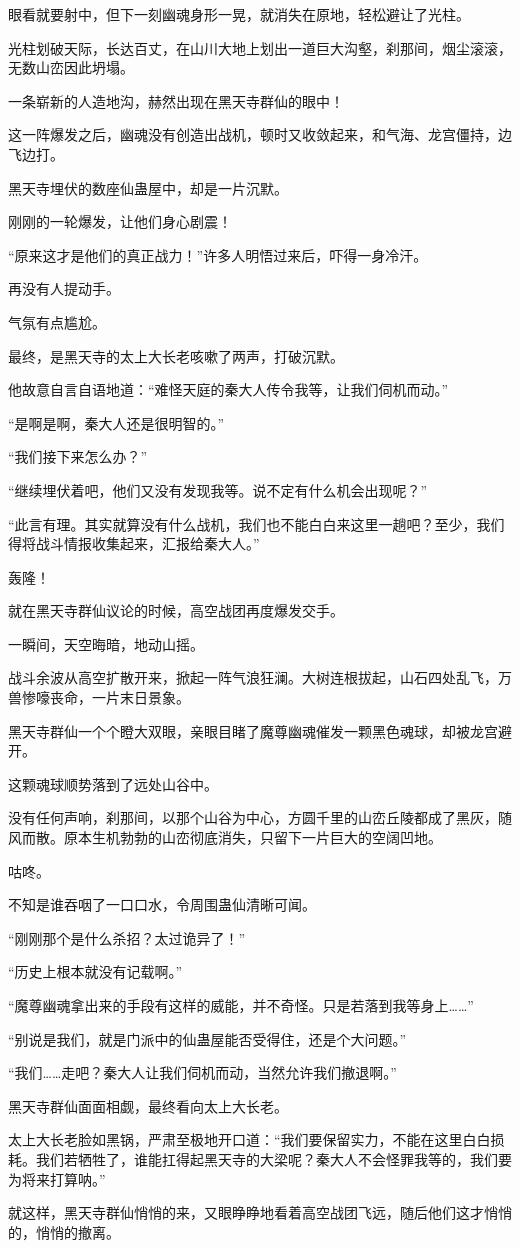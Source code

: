 \begin{this_body}
眼看就要射中，但下一刻幽魂身形一晃，就消失在原地，轻松避让了光柱。

光柱划破天际，长达百丈，在山川大地上划出一道巨大沟壑，刹那间，烟尘滚滚，无数山峦因此坍塌。

一条崭新的人造地沟，赫然出现在黑天寺群仙的眼中！

这一阵爆发之后，幽魂没有创造出战机，顿时又收敛起来，和气海、龙宫僵持，边飞边打。

黑天寺埋伏的数座仙蛊屋中，却是一片沉默。

刚刚的一轮爆发，让他们身心剧震！

“原来这才是他们的真正战力！”许多人明悟过来后，吓得一身冷汗。

再没有人提动手。

气氛有点尴尬。

最终，是黑天寺的太上大长老咳嗽了两声，打破沉默。

他故意自言自语地道：“难怪天庭的秦大人传令我等，让我们伺机而动。”

“是啊是啊，秦大人还是很明智的。”

“我们接下来怎么办？”

“继续埋伏着吧，他们又没有发现我等。说不定有什么机会出现呢？”

“此言有理。其实就算没有什么战机，我们也不能白白来这里一趟吧？至少，我们得将战斗情报收集起来，汇报给秦大人。”

轰隆！

就在黑天寺群仙议论的时候，高空战团再度爆发交手。

一瞬间，天空晦暗，地动山摇。

战斗余波从高空扩散开来，掀起一阵气浪狂澜。大树连根拔起，山石四处乱飞，万兽惨嚎丧命，一片末日景象。

黑天寺群仙一个个瞪大双眼，亲眼目睹了魔尊幽魂催发一颗黑色魂球，却被龙宫避开。

这颗魂球顺势落到了远处山谷中。

没有任何声响，刹那间，以那个山谷为中心，方圆千里的山峦丘陵都成了黑灰，随风而散。原本生机勃勃的山峦彻底消失，只留下一片巨大的空阔凹地。

咕咚。

不知是谁吞咽了一口口水，令周围蛊仙清晰可闻。

“刚刚那个是什么杀招？太过诡异了！”

“历史上根本就没有记载啊。”

“魔尊幽魂拿出来的手段有这样的威能，并不奇怪。只是若落到我等身上……”

“别说是我们，就是门派中的仙蛊屋能否受得住，还是个大问题。”

“我们……走吧？秦大人让我们伺机而动，当然允许我们撤退啊。”

黑天寺群仙面面相觑，最终看向太上大长老。

太上大长老脸如黑锅，严肃至极地开口道：“我们要保留实力，不能在这里白白损耗。我们若牺牲了，谁能扛得起黑天寺的大梁呢？秦大人不会怪罪我等的，我们要为将来打算呐。”

就这样，黑天寺群仙悄悄的来，又眼睁睁地看着高空战团飞远，随后他们这才悄悄的，悄悄的撤离。

\end{this_body}

